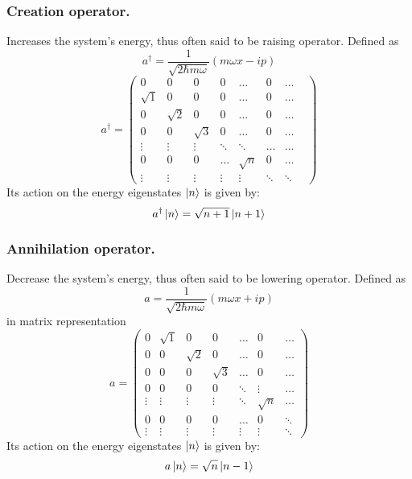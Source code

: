 \documentclass[../../../main.tex]{subfiles}
\begin{document}
\subsubsection*{Creation operator.} Increases the system's energy, thus often said to be raising operator. Defined as 
\begin{equation*}
    a^\dagger = \frac{1}{\sqrt{2\hbar m \omega}} \left( m\omega x - i p \right)
\end{equation*}
\begin{equation*}
    a^\dagger=\begin{pmatrix}
    0 & 0 & 0 & 0 & \dots & 0 & \dots \\
    \sqrt{1} & 0 & 0 & 0 & \dots & 0 & \dots \\
    0 & \sqrt{2} & 0 & 0 & \dots & 0 & \dots \\
    0 & 0 & \sqrt{3} & 0 & \dots & 0 & \dots \\
    \vdots & \vdots & \vdots & \ddots & \ddots & \dots & \dots \\
    0 & 0 & 0 & \dots & \sqrt{n} & 0 & \dots & \\
    \vdots & \vdots & \vdots & \vdots & \vdots & \ddots & \ddots 
\end{pmatrix}
\end{equation*}
Its action on the energy eigenstates $\ket{n}$ is given by:
\begin{equation*}
a^\dagger \ket{n} = \sqrt{n+1} \ket{n+1}
\end{equation*}

\subsubsection*{Annihilation operator.} Decrease the system's energy, thus often said to be lowering operator. Defined as
\begin{equation*}
    a = \frac{1}{\sqrt{2\hbar m \omega}} \left( m\omega x + i p \right)
\end{equation*}
in matrix representation
\begin{equation*}
    a=\begin{pmatrix}
        0 & \sqrt{1} & 0 & 0 & \dots & 0 & \dots \\
        0 & 0 & \sqrt{2} & 0 & \dots & 0 & \dots \\
        0 & 0 & 0 & \sqrt{3} & \dots & 0 & \dots \\
        0 & 0 & 0 & 0 & \ddots & \vdots & \dots \\
        \vdots & \vdots & \vdots & \vdots & \ddots & \sqrt{n} & \dots \\
        0 & 0 & 0 & 0 & \dots & 0 & \ddots \\
        \vdots & \vdots & \vdots & \vdots & \vdots & \vdots & \ddots 
    \end{pmatrix}
\end{equation*}
Its action on the energy eigenstates $\ket{n}$ is given by:
\begin{equation*}
    a \ket{n} = \sqrt{n} \ket{n-1}
\end{equation*}
\end{document}
